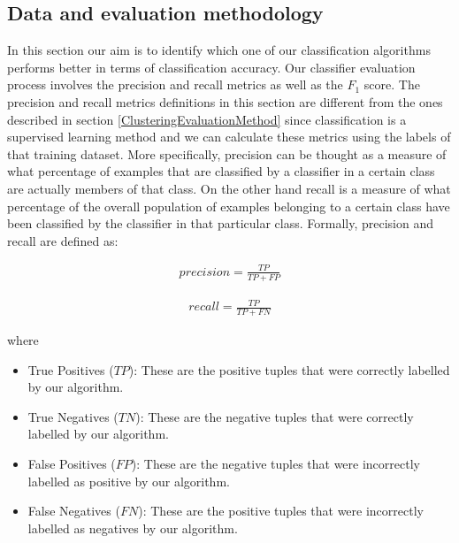 \subsection{Data and evaluation methodology}\label{ClassifiersEvaluationMethod}
In this section our aim is to identify which one of our classification algorithms performs better in terms of classification accuracy. Our classifier evaluation process involves the precision and recall metrics as well as the $F_1$ score. The precision and recall metrics definitions in this section are different from the ones described in section \ref{ClusteringEvaluationMethod} since classification is a supervised learning method and we can calculate these metrics using the labels of that training dataset. More specifically, precision can be thought as a measure of what percentage of examples that are classified by a classifier in a certain class are actually members of that class. On the other hand recall is a measure of what percentage of the overall population of examples belonging to a certain class have been classified by the classifier in that particular class. Formally, precision and recall are defined as:

\begin{eqnarray}
precision = \frac{TP}{TP + FP}
\end{eqnarray}  

\begin{eqnarray}
recall = \frac{TP}{TP + FN}
\end{eqnarray}  

where 

\begin{itemize}
  \item True Positives ($TP$): These are the positive tuples that were correctly labelled by our algorithm. 
  \item True Negatives ($TN$): These are the negative tuples that were correctly labelled by our algorithm.
  \item False Positives ($FP$): These are the negative tuples that were incorrectly labelled as positive by our algorithm.
  \item False Negatives ($FN$): These are the positive tuples that were incorrectly labelled as negatives by our algorithm.
\end{itemize}\vspace{15pt}

